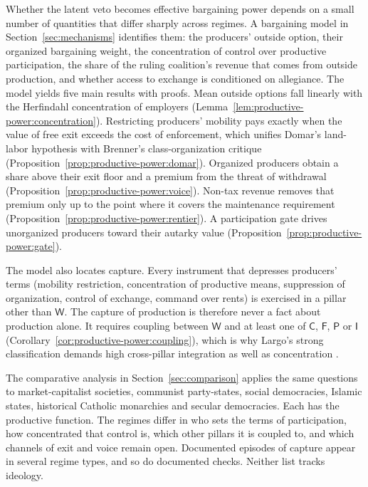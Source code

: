 \documentclass[11pt,letterpaper]{article}
\theoremstyle{definition}
\theoremstyle{remark}
\newcommand{\pF}{\mathsf{F}}
\newcommand{\pP}{\mathsf{P}}
\newcommand{\pI}{\mathsf{I}}
\newcommand{\pC}{\mathsf{C}}
\newcommand{\pW}{\mathsf{W}}
\begin{document}
Whether the latent veto becomes effective bargaining power depends on a small number of quantities that differ sharply across regimes. A bargaining model in Section~\ref{sec:mechanisms} identifies them: the producers' outside option, their organized bargaining weight, the concentration of control over productive participation, the share of the ruling coalition's revenue that comes from outside production, and whether access to exchange is conditioned on allegiance. The model yields five main results with proofs. Mean outside options fall linearly with the Herfindahl concentration of employers (Lemma~\ref{lem:productive-power:concentration}). Restricting producers' mobility pays exactly when the value of free exit exceeds the cost of enforcement, which unifies Domar's land-labor hypothesis with Brenner's class-organization critique (Proposition~\ref{prop:productive-power:domar}). Organized producers obtain a share above their exit floor and a premium from the threat of withdrawal (Proposition~\ref{prop:productive-power:voice}). Non-tax revenue removes that premium only up to the point where it covers the maintenance requirement (Proposition~\ref{prop:productive-power:rentier}). A participation gate drives unorganized producers toward their autarky value (Proposition~\ref{prop:productive-power:gate}).

The model also locates capture. Every instrument that depresses producers' terms (mobility restriction, concentration of productive means, suppression of organization, control of exchange, command over rents) is exercised in a pillar other than $\pW$. The capture of production is therefore never a fact about production alone. It requires coupling between $\pW$ and at least one of $\pC$, $\pF$, $\pP$ or $\pI$ (Corollary~\ref{cor:productive-power:coupling}), which is why Largo's strong classification demands high cross-pillar integration as well as concentration \citep{largo2026hbs}.

The comparative analysis in Section~\ref{sec:comparison} applies the same questions to market-capitalist societies, communist party-states, social democracies, Islamic states, historical Catholic monarchies and secular democracies. Each has the productive function. The regimes differ in who sets the terms of participation, how concentrated that control is, which other pillars it is coupled to, and which channels of exit and voice remain open. Documented episodes of capture appear in several regime types, and so do documented checks. Neither list tracks ideology.
\end{document}
